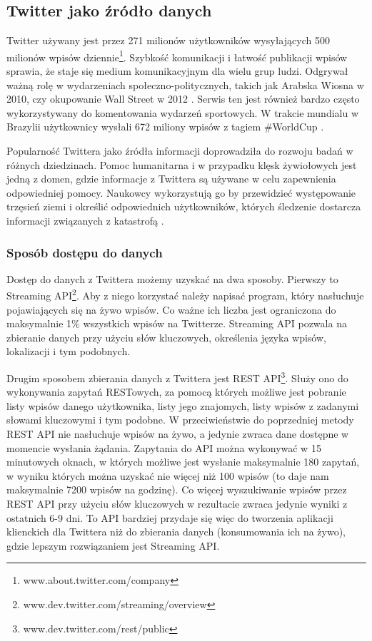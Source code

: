 \subsection{Twitter jako źródło danych}
Twitter używany jest przez 271 milionów użytkowników wysyłających 500 
milionów wpisów dziennie\footnote{www.about.twitter.com/company}.
Szybkość komunikacji i łatwość publikacji wpisów
sprawia, że staje się medium komunikacyjnym dla wielu grup ludzi.
Odgrywał ważną rolę w wydarzeniach społeczno-politycznych,
takich jak Arabska Wiosna w 2010, czy okupowanie Wall Street w 2012 
\cite{TwitterDataAnalytics2013}.
Serwis ten jest również bardzo często wykorzystywany do komentowania wydarzeń
sportowych. W trakcie mundialu w Brazylii użytkownicy wysłali 672 miliony
wpisów z tagiem \#WorldCup \cite{TwitterStatsWorldCup}.

Popularność Twittera jako źródła informacji doprowadziła do rozwoju badań
w różnych dziedzinach. Pomoc humanitarna i w przypadku klęsk żywiołowych
jest jedną z domen, gdzie informacje z Twittera są używane w celu zapewnienia
odpowiedniej pomocy. Naukowcy wykorzystują go by przewidzieć występowanie trzęsień
ziemi i określić odpowiednich użytkowników, których śledzenie dostarcza informacji
związanych z katastrofą \cite{TwitterDataAnalytics2013}.

\subsubsection{Sposób dostępu do danych}
Dostęp do danych z Twittera możemy uzyskać na dwa sposoby.
Pierwszy to Streaming API\footnote{www.dev.twitter.com/streaming/overview}.
Aby z niego korzystać należy napisać program, który nasłuchuje pojawiających się
na żywo wpisów. Co ważne ich liczba jest ograniczona do maksymalnie 1\% wszystkich
wpisów na Twitterze. Streaming API pozwala na zbieranie danych przy użyciu słów
kluczowych, określenia języka wpisów, lokalizacji i tym podobnych.

Drugim sposobem zbierania danych z Twittera jest REST 
API\footnote{www.dev.twitter.com/rest/public}. Służy ono do wykonywania
zapytań RESTowych, za pomocą których możliwe jest pobranie listy wpisów
danego użytkownika, listy jego znajomych, listy wpisów z zadanymi słowami
kluczowymi i tym podobne. W przeciwieństwie do poprzedniej metody REST API nie nasłuchuje
wpisów na żywo, a jedynie zwraca dane dostępne w momencie wysłania żądania.
Zapytania do API można wykonywać w 15 minutowych oknach, w których możliwe
jest wysłanie maksymalnie 180 zapytań, w wyniku których można uzyskać
nie więcej niż 100 wpisów (to daje nam maksymalnie 7200 wpisów na godzinę).
Co więcej wyszukiwanie wpisów przez REST API przy użyciu 
słów kluczowych w rezultacie zwraca jedynie wyniki z ostatnich
6-9 dni. 
To API bardziej przydaje się więc do tworzenia aplikacji
klienckich dla Twittera niż do zbierania danych (konsumowania ich na żywo),
gdzie lepszym rozwiązaniem jest Streaming API.



